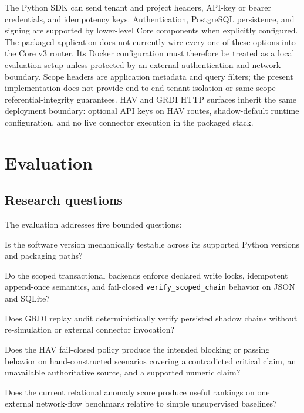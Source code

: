 \documentclass[11pt]{article}
\begin{document}
The Python SDK can send tenant and project headers, API-key or bearer
credentials, and idempotency keys. Authentication, PostgreSQL persistence, and
signing are supported by lower-level Core components when explicitly
configured. The packaged application does not currently wire every one of
these options into the Core v3 router. Its Docker configuration must therefore
be treated as a local evaluation setup unless protected by an external
authentication and network boundary. Scope headers are application metadata
and query filters; the present implementation does not provide end-to-end
tenant isolation or same-scope referential-integrity guarantees. HAV and GRDI
HTTP surfaces inherit the same deployment boundary: optional API keys on HAV
routes, shadow-default runtime configuration, and no live connector execution
in the packaged stack.

\section{Evaluation}

\subsection{Research questions}

The evaluation addresses five bounded questions:

\begin{description}[leftmargin=2.3cm,style=nextline]
  \item[RQ1] Is the software version mechanically testable across its supported
  Python versions and packaging paths?
  \item[RQ2] Do the scoped transactional backends enforce declared write locks,
  idempotent append-once semantics, and fail-closed
  \texttt{verify\_scoped\_chain} behavior on JSON and SQLite?
  \item[RQ3] Does GRDI replay audit deterministically verify persisted shadow
  chains without re-simulation or external connector invocation?
  \item[RQ4] Does the HAV fail-closed policy produce the intended blocking or
  passing behavior on hand-constructed scenarios covering a contradicted
  critical claim, an unavailable authoritative source, and a supported
  numeric claim?
  \item[RQ5] Does the current relational anomaly score produce useful rankings
  on one external network-flow benchmark relative to simple unsupervised
  baselines?
\end{description}
\end{document}
